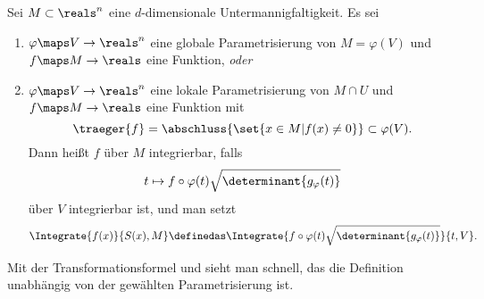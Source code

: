 \begin{definition}\label{mannigfaltigkeit_integral}
  Sei \( M\subset \reals^n \) eine \( d \)-dimensionale Untermannigfaltigkeit. Es sei 
  \begin{enumerate}[label=\rechtsklammer{\alph*}]
    \item\label{mannigfaltigkeit_integral:globale_parametisierung} \( \varphi\maps V\to \reals^n \) eine globale Parametrisierung von \( M=\varphi(V) \) und \( f\maps M\to \reals \) eine Funktion, \emph{oder}
    \item\label{mannigfaltigkeit_integral:lokale_parametisierung} \( \varphi\maps V\to \reals^n \) eine lokale Parametrisierung von \( M\cap U \) und \( f\maps M\to \reals \) eine Funktion mit 
    \begin{equation*}
      \traeger{f}=\abschluss{\set{x\in M|f(x)\neq 0}}\subset \varphi(V).
    \end{equation*}
    Dann heißt \( f \) über \( M \) integrierbar, falls
    \begin{equation*}
      t\mapsto f\circ \varphi(t)\sqrt{\determinant{g_{\varphi}(t)}}
    \end{equation*}
    über \( V \) integrierbar ist, und man setzt
    \begin{equation*}
      \Integrate{f(x)}{S(x),M}\definedas \Integrate{f\circ \varphi(t)\sqrt{\determinant{g_{\varphi}(t)}}}{t,V}.
    \end{equation*}
  \end{enumerate}
\end{definition}
\begin{bemerkung*}
  Mit der Transformationsformel und  sieht man schnell, das die Definition unabhängig von der gewählten Parametrisierung ist.
\end{bemerkung*}
